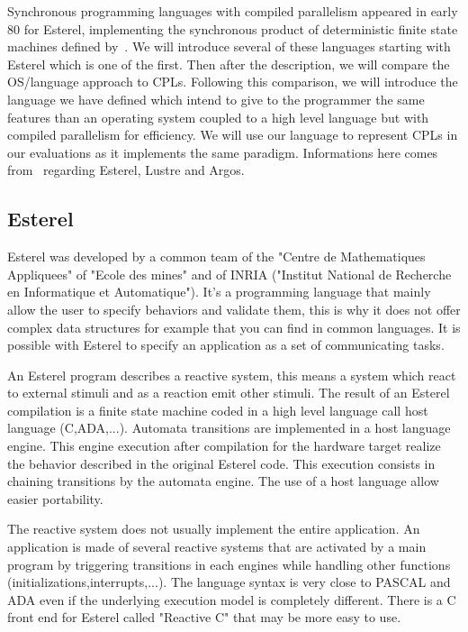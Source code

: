 \documentclass[10pt]{report}
\begin{document}
Synchronous programming languages with compiled parallelism appeared in early 80 for Esterel, implementing the synchronous product
of deterministic finite state machines defined by~\cite{ArnoldNivat:82}. We will introduce several of these languages starting with
Esterel which is one of the first. Then after the description, we will compare the OS/language approach to CPLs. Following this
comparison, we will introduce the language we have defined which intend to give to the programmer the same features than an
operating system coupled to a high level language but with compiled parallelism for efficiency. We will use our language to represent
CPLs in our evaluations as it implements the same paradigm. Informations here comes from~\cite{Halbwachs:91} regarding Esterel, Lustre
and Argos.

\subsection{Esterel}

Esterel was developed by a common team of the "Centre de Mathematiques Appliquees" of "Ecole des mines" and of INRIA ("Institut
National de Recherche en Informatique et Automatique"). It's a programming language that mainly allow the user to specify
behaviors and validate them, this is why it does not offer complex data structures for example that you can find in common
languages. It is possible with Esterel to specify an application as a set of communicating tasks.

An Esterel program describes a reactive system, this means a system which react to external stimuli and as a reaction emit other
stimuli. The result of an Esterel compilation is a finite state machine coded in a high level language call host language (C,ADA,...).
Automata transitions are implemented in a host language engine. This engine execution after compilation for the hardware target
realize the behavior described in the original Esterel code. This execution consists in chaining transitions by the automata engine.
The use of a host language allow easier portability.

The reactive system does not usually implement the entire application. An application is made of several reactive systems that are
activated by a main program by triggering transitions in each engines while handling other functions (initializations,interrupts,...).
The language syntax is very close to PASCAL and ADA even if the underlying execution model is completely different. There is
a C front end for Esterel called "Reactive C" that may be more easy to use.
\end{document}
